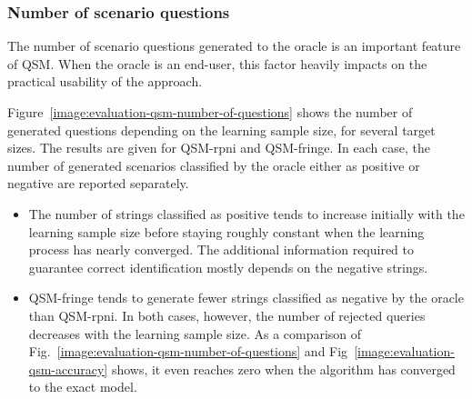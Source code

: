 \subsubsection*{Number of scenario questions\label{subsection:evaluation-synthetic-queries-on-qsm}}

The number of scenario questions generated to the oracle is an important feature of QSM. When the oracle is an end-user, this factor heavily impacts on the practical usability of the approach. 

Figure~\ref{image:evaluation-qsm-number-of-questions} shows the number of generated questions depending on the learning sample size, for several target sizes. The results are given for QSM-rpni and QSM-fringe. In each case, the number of generated scenarios classified by the oracle either as positive or negative are reported separately.
\begin{itemize}
\item The number of strings classified as positive tends to increase initially with the learning sample size before staying roughly constant when the learning process has nearly converged. The additional information required to guarantee correct identification mostly depends on the negative strings.
\item QSM-fringe tends to generate fewer strings classified as negative by the oracle than QSM-rpni. In both cases, however, the number of rejected queries decreases with the learning sample size. As a comparison of Fig.~\ref{image:evaluation-qsm-number-of-questions} and Fig~\ref{image:evaluation-qsm-accuracy} shows, it even reaches zero when the algorithm has converged to the exact model.
\end{itemize}

